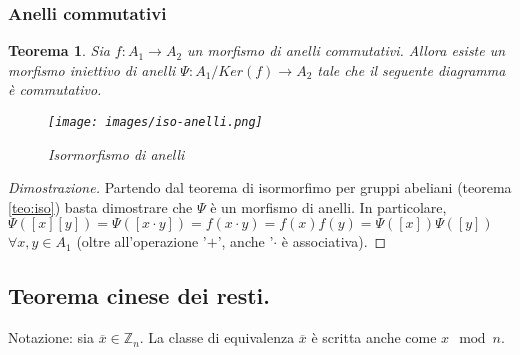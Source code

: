 \documentclass{article}
\theoremstyle{definition}
\theoremstyle{plain}
\theoremstyle{plain}
\theoremstyle{plain}
\newtheorem{teorema}{Teorema}
\theoremstyle{plain}
\begin{document}
\subsubsection*{Anelli commutativi}
\begin{teorema}
    Sia $f:A_1 \rightarrow A_2$ un morfismo di anelli commutativi. Allora esiste un morfismo iniettivo di anelli $\Psi : A_1 / {Ker(f)} \rightarrow A_2$ tale che il seguente diagramma è commutativo.

    \begin{figure}[h]
        \centering
        \texttt{[image: images/iso-anelli.png]}
        \caption{Isormorfismo di anelli}
        \label{fig:iso-anelli}
    \end{figure}

\end{teorema}
\begin{proof}[Dimostrazione]
    Partendo dal teorema di isormorfimo per gruppi abeliani (teorema \ref{teo:iso}) basta dimostrare che $\Psi$ è un morfismo di anelli. In particolare, $\Psi([x][y]) = \Psi([x \cdot y]) = f(x \cdot y) = f(x)f(y) = \Psi([x])\Psi([y])$ $\forall x, y \in A_1$ (oltre all'operazione '$+$', anche '$\cdot$ è associativa).
\end{proof}

\subsection{Teorema cinese dei resti.}
Notazione: sia $\overline{x} \in \mathbb{Z}_n$. La classe di equivalenza  $\overline{x}$ è scritta anche come $x \mod n$.
\end{document}
